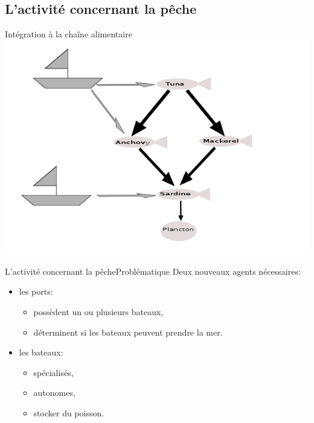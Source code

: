 \documentclass[t, 10pt]{beamer}
\begin{document}
	\subsection{L'activité concernant la pêche}
	
        \begin{frame}{Intégration à la chaîne alimentaire}
          \includegraphics[height=0.9\textheight]{img/pecheur.png}
        \end{frame}        
        
        \begin{frame}[c]{L'activité concernant la pêche}{Problématique}
          Deux nouveaux agents nécessaires:
          \newline 
          \begin{itemize}
          \item{les ports:
            \begin{itemize}
            \item{possèdent un ou plusieurs bateaux,}
            \item{déterminent si les bateaux peuvent prendre la mer.}
            \end{itemize}
	  }
	  \item{les bateaux:
            \begin{itemize}
            \item{spécialisés,}
            \item{autonomes,}
            \item{stocker du poisson.}
	    \end{itemize}
	  }
          \end{itemize}
        \end{frame}
\end{document}
